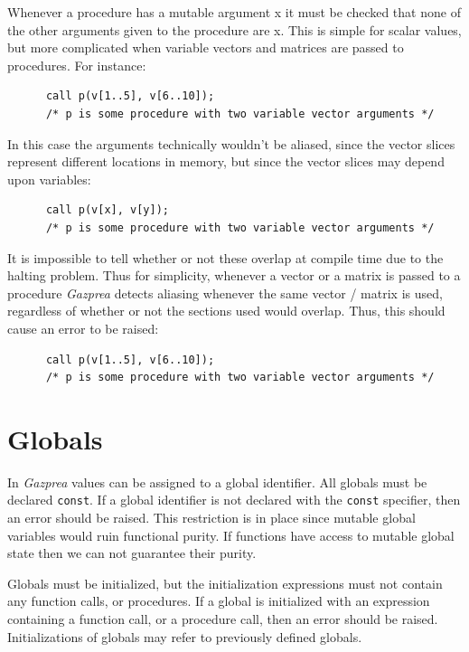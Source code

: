 \documentclass{article}
\begin{document}
    Whenever a procedure has a mutable argument x it must be checked that none of the other arguments given to the
    procedure are x. This is simple for scalar values, but more complicated when variable vectors and matrices are
    passed to procedures. For instance:

    \begin{lstlisting}
      call p(v[1..5], v[6..10]);
      /* p is some procedure with two variable vector arguments */
    \end{lstlisting}

    In this case the arguments technically wouldn't be aliased, since the vector slices represent different
    locations in memory, but since the vector slices may depend upon variables:

    \begin{lstlisting}
      call p(v[x], v[y]);
      /* p is some procedure with two variable vector arguments */
    \end{lstlisting}

    It is impossible to tell whether or not these overlap at compile time due to the halting problem. Thus for
    simplicity, whenever a vector or a matrix is passed to a procedure \textit{Gazprea} detects aliasing whenever the
    same vector / matrix is used, regardless of whether or not the sections used would overlap.  Thus, this should
    cause an error to be raised:

    \begin{lstlisting}
      call p(v[1..5], v[6..10]);
      /* p is some procedure with two variable vector arguments */
    \end{lstlisting}


\section{Globals}\label{sec:global}
  In \textit{Gazprea} values can be assigned to a global identifier. All globals must be declared \texttt{const}. If a
  global identifier is not declared with the \texttt{const} specifier, then an error should be raised. This
  restriction is in place since mutable global variables would ruin functional purity. If functions have access to
  mutable global state then we can not guarantee their purity.

  Globals must be initialized, but the initialization expressions must not contain any function calls, or procedures.
  If a global is initialized with an expression containing a function call, or a procedure call, then an error should
  be raised. Initializations of globals may refer to previously defined globals.
\end{document}
